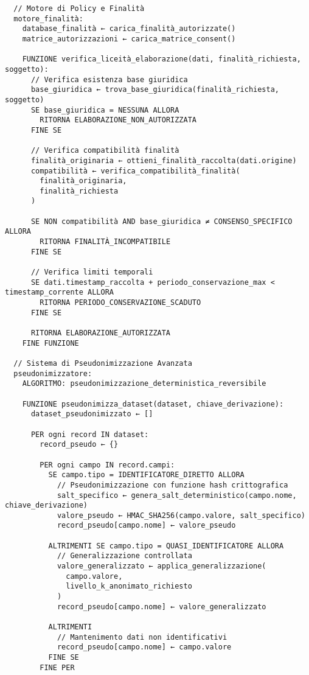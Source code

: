 {\begin{verbatim}
  // Motore di Policy e Finalità
  motore_finalità:
    database_finalità ← carica_finalità_autorizzate()
    matrice_autorizzazioni ← carica_matrice_consent()
    
    FUNZIONE verifica_liceità_elaborazione(dati, finalità_richiesta, soggetto):
      // Verifica esistenza base giuridica
      base_giuridica ← trova_base_giuridica(finalità_richiesta, soggetto)
      SE base_giuridica = NESSUNA ALLORA
        RITORNA ELABORAZIONE_NON_AUTORIZZATA
      FINE SE
      
      // Verifica compatibilità finalità
      finalità_originaria ← ottieni_finalità_raccolta(dati.origine)
      compatibilità ← verifica_compatibilità_finalità(
        finalità_originaria, 
        finalità_richiesta
      )
      
      SE NON compatibilità AND base_giuridica ≠ CONSENSO_SPECIFICO ALLORA
        RITORNA FINALITÀ_INCOMPATIBILE
      FINE SE
      
      // Verifica limiti temporali
      SE dati.timestamp_raccolta + periodo_conservazione_max < timestamp_corrente ALLORA
        RITORNA PERIODO_CONSERVAZIONE_SCADUTO
      FINE SE
      
      RITORNA ELABORAZIONE_AUTORIZZATA
    FINE FUNZIONE

  // Sistema di Pseudonimizzazione Avanzata
  pseudonimizzatore:
    ALGORITMO: pseudonimizzazione_deterministica_reversibile
    
    FUNZIONE pseudonimizza_dataset(dataset, chiave_derivazione):
      dataset_pseudonimizzato ← []
      
      PER ogni record IN dataset:
        record_pseudo ← {}
        
        PER ogni campo IN record.campi:
          SE campo.tipo = IDENTIFICATORE_DIRETTO ALLORA
            // Pseudonimizzazione con funzione hash crittografica
            salt_specifico ← genera_salt_deterministico(campo.nome, chiave_derivazione)
            valore_pseudo ← HMAC_SHA256(campo.valore, salt_specifico)
            record_pseudo[campo.nome] ← valore_pseudo
            
          ALTRIMENTI SE campo.tipo = QUASI_IDENTIFICATORE ALLORA
            // Generalizzazione controllata
            valore_generalizzato ← applica_generalizzazione(
              campo.valore, 
              livello_k_anonimato_richiesto
            )
            record_pseudo[campo.nome] ← valore_generalizzato
            
          ALTRIMENTI
            // Mantenimento dati non identificativi
            record_pseudo[campo.nome] ← campo.valore
          FINE SE
        FINE PER
        

\end{verbatim}}
